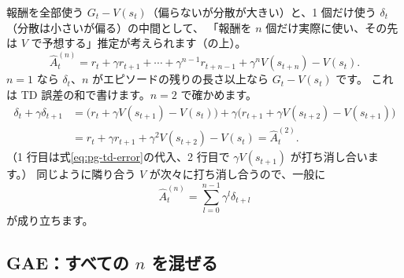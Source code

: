 報酬を全部使う $G_t-V(s_t)$（偏らないが分散が大きい）と、1 個だけ使う $\delta_t$（分散は小さいが偏る）の中間として、
「報酬を $n$ 個だけ実際に使い、その先は $V$ で予想する」推定が考えられます（の上）。
\begin{equation}
\hat{A}^{(n)}_t=r_t+\gamma r_{t+1}+\cdots+\gamma^{n-1}r_{t+n-1}+\gamma^{n}V(s_{t+n})-V(s_t).
\label{eq:pg-nstep}
\end{equation}
$n=1$ なら $\delta_t$、$n$ がエピソードの残りの長さ以上なら $G_t-V(s_t)$ です。
これは TD 誤差の和で書けます。$n=2$ で確かめます。
\begin{align*}
\delta_t+\gamma\delta_{t+1}
&=\bigl(r_t+\gamma V(s_{t+1})-V(s_t)\bigr)+\gamma\bigl(r_{t+1}+\gamma V(s_{t+2})-V(s_{t+1})\bigr)\\
&=r_t+\gamma r_{t+1}+\gamma^2V(s_{t+2})-V(s_t)=\hat{A}^{(2)}_t .
\end{align*}
（1 行目は式\eqref{eq:pg-td-error}の代入、2 行目で $\gamma V(s_{t+1})$ が打ち消し合います。）
同じように隣り合う $V$ が次々に打ち消し合うので、一般に
\begin{equation}
\hat{A}^{(n)}_t=\sum_{l=0}^{n-1}\gamma^{l}\delta_{t+l}
\label{eq:pg-nstep-delta}
\end{equation}
が成り立ちます。

\subsection*{GAE：すべての $n$ を混ぜる}


